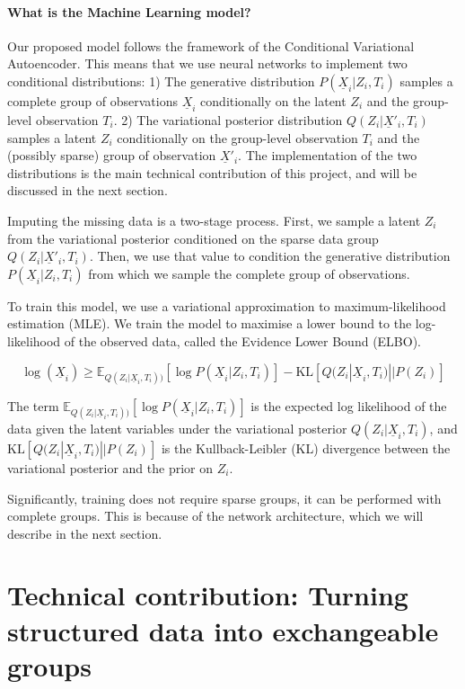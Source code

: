 \documentclass[backrefs]{cam-thesis}
\begin{document}
\paragraph{What is the Machine Learning model?} Our proposed model follows the framework of the Conditional Variational Autoencoder. This means that we use neural networks to implement two conditional distributions: 1) The generative distribution $P(\underline{X}_i | Z_i, T_i)$ samples a complete group of observations $\underline{X}_i$ conditionally on the latent $Z_i$ and the group-level observation $T_i$. 2) The variational posterior distribution $Q(Z_i | \underline{X}'_i, T_i)$ samples a latent $Z_i$ conditionally on the group-level observation $T_i$ and the (possibly sparse) group of observation $\underline{X}'_i$. The implementation of the two distributions is the main technical contribution of this project, and will be discussed in the next section.

Imputing the missing data is a two-stage process. First, we sample a latent $Z_i$ from the variational posterior conditioned on the sparse data group $Q(Z_i | \underline{X}'_i, T_i)$. Then, we use that value to condition the generative distribution $P(\underline{X}_i | Z_i, T_i)$ from which we sample the complete group of observations.

To train this model, we use a variational approximation to maximum-likelihood estimation (MLE). We train the model to maximise a lower bound to the log-likelihood of the observed data, called the Evidence Lower Bound (ELBO).

\begin{equation}
    \log (\underline{X}_i) \geq \mathbb{E}_{Q(Z_i | \underline{X}_i, T_i))} [\log P(\underline{X}_i | Z_i, T_i)] - \mathrm{KL} [Q(Z_i | \underline{X}_i, T_i) || P(Z_i)]
\end{equation}

The term $\mathbb{E}_{Q(Z_i | \underline{X}_i, T_i))} [\log P(\underline{X}_i | Z_i, T_i)]$ is the expected log likelihood of the data given the latent variables under the variational posterior $Q(Z_i | \underline{X}_i, T_i)$, and $\mathrm{KL} [Q(Z_i | \underline{X}_i, T_i) || P(Z_i)]$ is the Kullback-Leibler (KL) divergence between the variational posterior and the prior on $Z_i$.

Significantly, training does not require sparse groups, it can be performed with complete groups. This is because of the network architecture, which we will describe in the next section.

\section{Technical contribution: Turning structured data into exchangeable groups}
\end{document}
